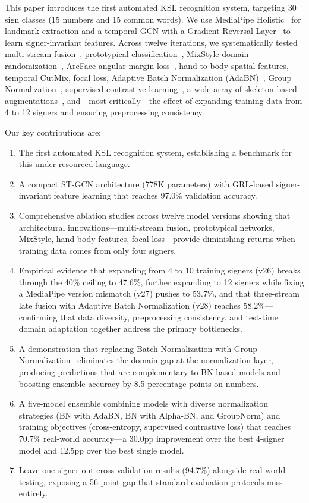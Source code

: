 \documentclass[conference]{IEEEtran}
\begin{document}
This paper introduces the first automated KSL recognition system, targeting 30 sign classes (15 numbers and 15 common words). We use MediaPipe Holistic~\cite{zhang2020mediapipe} for landmark extraction and a temporal GCN with a Gradient Reversal Layer~\cite{ganin2016domain} to learn signer-invariant features. Across twelve iterations, we systematically tested multi-stream fusion~\cite{shi2019twostreamAGCN}, prototypical classification~\cite{snell2017prototypical}, MixStyle domain randomization~\cite{zhou2021mixstyle}, ArcFace angular margin loss~\cite{deng2019arcface}, hand-to-body spatial features, temporal CutMix, focal loss, Adaptive Batch Normalization (AdaBN)~\cite{li2017adabn}, Group Normalization~\cite{wu2018groupnorm}, supervised contrastive learning~\cite{khosla2020supcon}, a wide array of skeleton-based augmentations~\cite{kolawole2024augmentation}, and---most critically---the effect of expanding training data from 4 to 12 signers and ensuring preprocessing consistency.

Our key contributions are:
\begin{enumerate}
    \item The first automated KSL recognition system, establishing a benchmark for this under-resourced language.
    \item A compact ST-GCN architecture (778K parameters) with GRL-based signer-invariant feature learning that reaches 97.0\% validation accuracy.
    \item Comprehensive ablation studies across twelve model versions showing that architectural innovations---multi-stream fusion, prototypical networks, MixStyle, hand-body features, focal loss---provide diminishing returns when training data comes from only four signers.
    \item Empirical evidence that expanding from 4 to 10 training signers (v26) breaks through the 40\% ceiling to 47.6\%, further expanding to 12 signers while fixing a MediaPipe version mismatch (v27) pushes to 53.7\%, and that three-stream late fusion with Adaptive Batch Normalization (v28) reaches 58.2\%---confirming that data diversity, preprocessing consistency, and test-time domain adaptation together address the primary bottlenecks.
    \item A demonstration that replacing Batch Normalization with Group Normalization~\cite{wu2018groupnorm} eliminates the domain gap at the normalization layer, producing predictions that are complementary to BN-based models and boosting ensemble accuracy by 8.5 percentage points on numbers.
    \item A five-model ensemble combining models with diverse normalization strategies (BN with AdaBN, BN with Alpha-BN, and GroupNorm) and training objectives (cross-entropy, supervised contrastive loss) that reaches 70.7\% real-world accuracy---a 30.0pp improvement over the best 4-signer model and 12.5pp over the best single model.
    \item Leave-one-signer-out cross-validation results (94.7\%) alongside real-world testing, exposing a 56-point gap that standard evaluation protocols miss entirely.
\end{enumerate}
\end{document}
